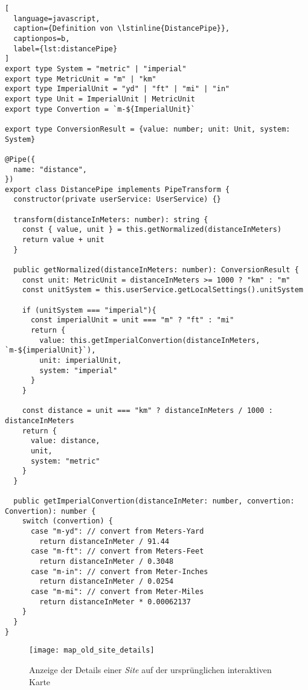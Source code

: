 \begin{lstlisting}[
  language=javascript,
  caption={Definition von \lstinline{DistancePipe}},
  captionpos=b,
  label={lst:distancePipe}
]
export type System = "metric" | "imperial"
export type MetricUnit = "m" | "km"
export type ImperialUnit = "yd" | "ft" | "mi" | "in"
export type Unit = ImperialUnit | MetricUnit
export type Convertion = `m-${ImperialUnit}`

export type ConversionResult = {value: number; unit: Unit, system: System}

@Pipe({
  name: "distance",
})
export class DistancePipe implements PipeTransform {
  constructor(private userService: UserService) {}

  transform(distanceInMeters: number): string {
    const { value, unit } = this.getNormalized(distanceInMeters)
    return value + unit
  }

  public getNormalized(distanceInMeters: number): ConversionResult {
    const unit: MetricUnit = distanceInMeters >= 1000 ? "km" : "m"
    const unitSystem = this.userService.getLocalSettings().unitSystem

    if (unitSystem === "imperial"){
      const imperialUnit = unit === "m" ? "ft" : "mi"
      return {
        value: this.getImperialConvertion(distanceInMeters, `m-${imperialUnit}`),
        unit: imperialUnit,
        system: "imperial"
      }
    }

    const distance = unit === "km" ? distanceInMeters / 1000 : distanceInMeters
    return {
      value: distance,
      unit,
      system: "metric"
    }
  }

  public getImperialConvertion(distanceInMeter: number, convertion: Convertion): number {
    switch (convertion) {
      case "m-yd": // convert from Meters-Yard
        return distanceInMeter / 91.44
      case "m-ft": // convert from Meters-Feet
        return distanceInMeter / 0.3048
      case "m-in": // convert from Meter-Inches
        return distanceInMeter / 0.0254
      case "m-mi": // convert from Meter-Miles
        return distanceInMeter * 0.00062137
    }
  }
}
\end{lstlisting}


\begin{figure}[H]
  \centering
  \texttt{[image: map\_old\_site\_details]}
  \caption{Anzeige der Details einer \textit{Site} auf der ursprünglichen interaktiven Karte}
  \label{fig:map_old_site_details}
\end{figure}




